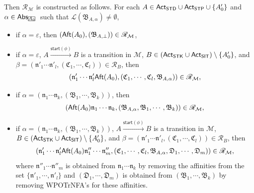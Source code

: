 \documentclass[preprint,12pt]{elsarticle}
\newcommand\rectangled[1]{\tikz[baseline=(torect.base)]{
    \node[shape = rectangle, draw, inner sep=0pt, outer sep = 0pt] (torect) {#1}
    }
}
\newcommand{\mrectangled}[1]{\text{\rectangled{\ensuremath{#1}}}}
\newcommand{\mhcancel}[1]{\mrectangled{#1}}
\newcommand\Mm{{\mathcal{M} }}
\newcommand\act{{\sf Act}}
\newcommand\aft{{\sf Aft}}
\newcommand\standard{{\sf STD}}
\newcommand\singletop{{\sf STP}}
\newcommand\singletask{{\sf STK}}
\newcommand\singleinstance{{\sf SIT}}
\newcommand\startactivity{{\mathsf{start} }}
\newcommand\abs{{\mathsf{Abs} }}
\newcommand\aname{\mathfrak{n}}
\newcommand\AutReach{\mathscr{R}}
\newcommand\AutB{{\mathfrak{B} }}
\newcommand\AutC{{\mathfrak{C} }}
\newcommand\AutD{{\mathfrak{D} }}
\newcommand\Lang{{\mathscr{L} }}
\newcommand{\WOTrNFA}{\textsf{WPOTrNFA}}
\begin{document}
Then $\AutReach_\Mm$ is constructed as follows. 
For each $A \in \act_\standard \cup \act_\singletop \cup \{A'_0\}$ and $\alpha \in \abs_{\mhcancel{A_0}}$ such that $\Lang(\AutB_{A, \alpha}) \neq \emptyset$,
\begin{itemize}
    \item if $\alpha = \varepsilon$, then $(\aft(A_0), (\AutB_{A, \bot})) \in \AutReach_\Mm$,
    \item if $\alpha = \varepsilon$, $A \xrightarrow{\startactivity(\phi)} B$ is a transition in $\Mm$, $B \in (\act_\singletask \cup \act_\singleinstance) \setminus \{A'_0\}$,  and $\beta = (\aname'_1 \cdots  \aname'_l, (\AutC_1, \cdots, \AutC_l)) \in \AutReach_B$, then 
    $$(\aname'_1 \cdots  \aname'_l \aft(A_0), (\AutC_1, \cdots, \AutC_l, \AutB_{A, \alpha})) \in \AutReach_\Mm,$$  
    \item if $\alpha = (\aname_1 \cdots \aname_k, (\AutB_1, \cdots, \AutB_k))$, then 
    $$(\aft(A_0)\aname_1 \cdots \aname_k, (\AutB_{A, \alpha}, \AutB_1, \cdots, \AutB_k)) \in \AutReach_\Mm,$$
    \item if $\alpha = (\aname_1 \cdots \aname_k, (\AutB_1,\cdots,\AutB_k))$, $A \xrightarrow{\startactivity(\phi)} B$ is a transition in $\Mm$, $B \in (\act_\singletask \cup \act_\singleinstance) \setminus \{A'_0\}$,  and $\beta = (\aname'_1 \cdots  \aname'_l, (\AutC_1, \cdots, \AutC_l)) \in \AutReach_B$, then 
    $$(\aname'_1 \cdots  \aname'_l \aft(A_0) \aname''_1 \cdots \aname''_m, (\AutC_1, \cdots, \AutC_l, \AutB_{A, \alpha}, \AutD_1, \cdots, \AutD_m)) \in \AutReach_\Mm,$$ 
    where $\aname''_1 \cdots \aname''_m$ is obtained from $\aname_1 \cdots \aname_k$ by removing the affinities from the set $\{\aname'_1, \cdots, \aname'_l\}$ and $(\AutD_1, \cdots, \AutD_m)$ is obtained from $(\AutB_1, \cdots, \AutB_k)$ by removing {\WOTrNFA}'s for these affinities.  
\end{itemize}
\end{document}
